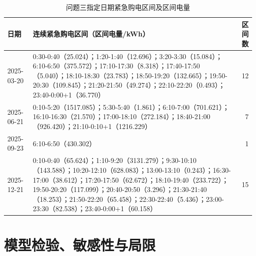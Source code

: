 \documentclass[UTF8,12pt,a4paper]{ctexart}
\begin{document}
\begin{table}[H]\centering\scriptsize\caption{问题三指定日期紧急购电区间及区间电量}\label{tab:q3emg_detail}
\begin{tabular}{lp{.64\linewidth}r}\toprule 日期&连续紧急购电区间（区间电量/kWh）&区间数\\\midrule
2025-03-20&0:30-0:40（25.024）；1:20-1:40（12.696）；3:20-3:30（15.084）；6:10-6:50（375.572）；17:10-17:30（8.318）；17:40-17:50（5.040）；18:10-18:30（23.783）；18:50-19:20（132.665）；19:50-20:30（109.845）；21:20-21:50（49.274）；22:10-22:20（0.493）；23:40-0:00+1（36.770）&12\\
2025-06-21&0:10-5:20（1517.085）；5:30-5:40（1.861）；6:10-7:00（701.621）；16:10-16:30（21.570）；17:00-18:10（272.184）；18:40-21:00（926.420）；21:10-0:10+1（1216.229）&7\\
2025-09-23&6:10-6:50（430.302）&1\\
2025-12-21&0:10-0:40（65.624）；1:10-9:20（3131.279）；9:30-10:10（143.588）；10:20-12:10（628.083）；13:00-13:10（0.243）；16:30-17:00（38.612）；17:20-17:50（62.672）；18:10-19:40（233.722）；19:50-20:20（117.099）；20:40-20:50（3.296）；21:30-21:40（18.253）；21:50-22:20（65.458）；22:30-22:40（5.436）；23:00-23:30（82.538）；23:40-0:00+1（60.158）&15\\
\bottomrule\end{tabular}\end{table}

\section{模型检验、敏感性与局限}
\end{document}
